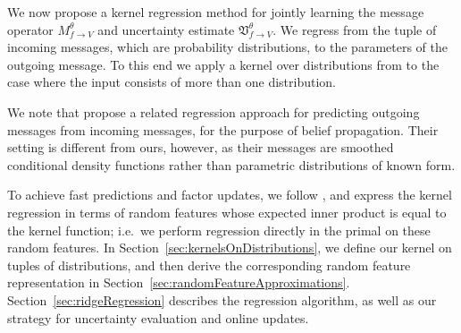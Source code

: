 \documentclass[english]{article}
\theoremstyle{plain}
\theoremstyle{plain}
\newcommand{\factor}{f}				%
\newcommand{\outV}{V}                         %
\newcommand{\approxMsg}[3]{M_{#1 \rightarrow #2}^{#3}}			%
\newcommand{\uncertaintyMsg}[3]{{\mathfrak V}_{#1 \rightarrow #2}^{#3}}			%
\newcommand{\secref}[1]{Section~\ref{#1}}
\begin{document}
We now propose a kernel regression method for jointly learning the message operator $\approxMsg{\factor}{\outV}{\theta}$ and
uncertainty estimate $\uncertaintyMsg{\factor}{\outV}{\theta}$. We regress from the tuple of incoming messages, which
are probability distributions, to the parameters of the outgoing message. 
To this end we apply a kernel over distributions from \citep{Christmann2010} 
to the case where the input consists of more than one distribution.

We note that \citet{SonGreGue10,SonGreBicLowGue11} propose a related regression approach for predicting outgoing
messages from incoming messages, for the purpose of belief propagation. 
Their setting is  different from ours, however, as their messages are smoothed conditional density functions rather than parametric distributions of known form.

To achieve fast predictions and factor updates, we follow
\citet{Rahimi2007,Le2013,YanSmoZonWil14}, and express the kernel regression in
terms of random features whose expected inner product
is equal to the kernel function; i.e.\ we perform regression directly in the primal on these random features.
In \secref{sec:kernelsOnDistributions}, we define our kernel on tuples of distributions, and then derive the corresponding random feature representation in 
\secref{sec:randomFeatureApproximations}. \secref{sec:ridgeRegression} describes the regression algorithm, as well as our strategy for uncertainty evaluation and online updates.
\end{document}
